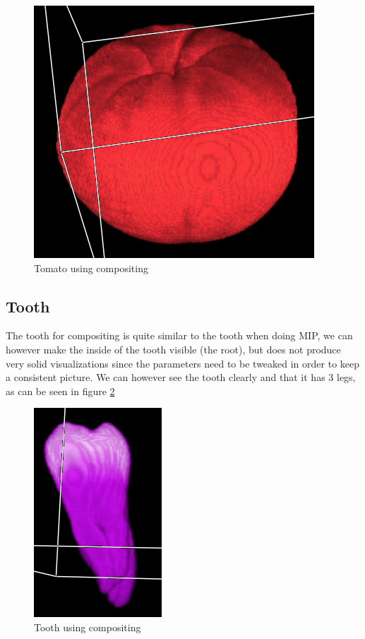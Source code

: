 \documentclass[a4paper,twoside,11pt]{article}
\begin{document}
  \begin{figure}[h]
 \centering
 \includegraphics[scale=0.5]{images/tomatoComp}
 \caption{Tomato using compositing}
 \label{tomatoComp}
  \end{figure} 
 
 \subsection{Tooth}
 The tooth for compositing is quite similar to the tooth when doing MIP, we can however make the inside of the tooth visible (the root), but does not produce very solid visualizations since the parameters need to be tweaked in order to keep a consistent picture. We can however see the tooth clearly and that it has 3 legs, as can be seen in figure \ref{toothComp}
 
   \begin{figure}[h]
 \centering
 \includegraphics[scale=0.5]{images/toothComp}
 \caption{Tooth using compositing}
 \label{toothComp}
  \end{figure} 
 
\end{document}
